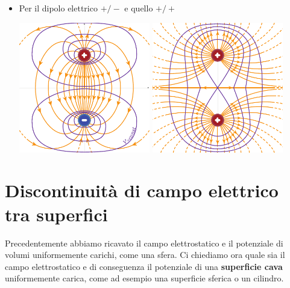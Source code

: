 \begin{examples}
\begin{itemize}
		\item Per il dipolo elettrico $+/-$ e quello $+/+$
		\begin{center}
			\includegraphics[width=0.45\textwidth]{images/chp3/chp3potcampodipolo1.pdf}\hspace{20pt}
			\includegraphics[width=0.45\textwidth]{images/chp3/chp3potcampodipolo2.pdf}
		\end{center}
	\end{itemize}
\end{examples}
\section{Discontinuità di campo elettrico tra superfici}
Precedentemente abbiamo ricavato il campo elettrostatico e il potenziale di volumi uniformemente carichi, come una sfera. Ci chiediamo ora quale sia il campo elettrostatico e di conseguenza il potenziale di una \textbf{superficie cava} uniformemente carica, come ad esempio una superficie sferica o un cilindro.
